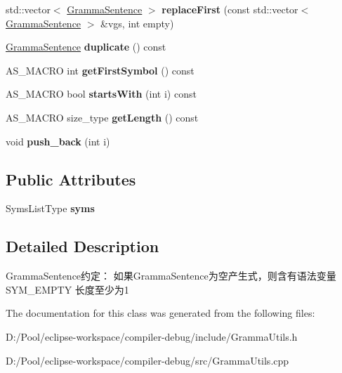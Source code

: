 \begin{DoxyCompactItemize}
\item 
\mbox{\label{classx2_1_1_gramma_sentence_aaa3adf3d7d6642e08adb7c619d1a3c1f}} 
std\+::vector$<$ \hyperlink{classx2_1_1_gramma_sentence}{Gramma\+Sentence} $>$ {\bfseries replace\+First} (const std\+::vector$<$ \hyperlink{classx2_1_1_gramma_sentence}{Gramma\+Sentence} $>$ \&vgs, int empty)
\item 
\mbox{\label{classx2_1_1_gramma_sentence_ae9c2408b6a175986d70914139ba08ab4}} 
\hyperlink{classx2_1_1_gramma_sentence}{Gramma\+Sentence} {\bfseries duplicate} () const
\item 
\mbox{\label{classx2_1_1_gramma_sentence_a4312f5a83549fd228e1b119b0969a142}} 
A\+S\+\_\+\+M\+A\+C\+RO int {\bfseries get\+First\+Symbol} () const
\item 
\mbox{\label{classx2_1_1_gramma_sentence_abe7ce37e3ae87d5b593b3521eccabe5a}} 
A\+S\+\_\+\+M\+A\+C\+RO bool {\bfseries starts\+With} (int i) const
\item 
\mbox{\label{classx2_1_1_gramma_sentence_a07e2e2a7bf13008a55c9a71f1e3ccbb9}} 
A\+S\+\_\+\+M\+A\+C\+RO size\+\_\+type {\bfseries get\+Length} () const
\item 
\mbox{\label{classx2_1_1_gramma_sentence_a3e6c91515206b17988bd9dab613976b2}} 
void {\bfseries push\+\_\+back} (int i)
\end{DoxyCompactItemize}
\subsection*{Public Attributes}
\begin{DoxyCompactItemize}
\item 
\mbox{\label{classx2_1_1_gramma_sentence_a425eeca4d66cc4c28544b3b6f1027b06}} 
Syms\+List\+Type {\bfseries syms}
\end{DoxyCompactItemize}


\subsection{Detailed Description}
Gramma\+Sentence约定： 如果\+Gramma\+Sentence为空产生式，则含有语法变量 S\+Y\+M\+\_\+\+E\+M\+P\+TY 长度至少为1 

The documentation for this class was generated from the following files\+:\begin{DoxyCompactItemize}
\item 
D\+:/\+Pool/eclipse-\/workspace/compiler-\/debug/include/Gramma\+Utils.\+h\item 
D\+:/\+Pool/eclipse-\/workspace/compiler-\/debug/src/Gramma\+Utils.\+cpp\end{DoxyCompactItemize}
